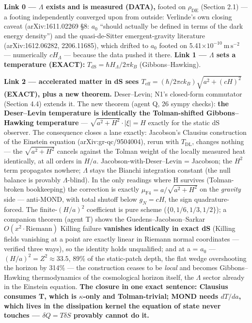 \documentclass[11pt,a4paper]{article}
\begin{document}
\textbf{Link 0 --- $\Lambda$ exists and is measured (DATA),} footed on $\rho_{\mathrm{DE}}$ (Section 2.1) --- a footing independently converged upon from outside: Verlinde's own closing caveat (arXiv:1611.02269 \S{}8: $a_{0}$ ``should actually be defined in terms of the dark energy density'') and the quasi-de-Sitter emergent-gravity literature (arXiv:1612.06282, 2206.11685), which drifted to $a_{0}$ footed on 5.41$\times10^{-10}\ \mathrm{m\,s^{-2}}$ --- numerically $cH_\Lambda$ --- because the data pushed it there. \textbf{Link 1 --- $\Lambda$ sets a temperature (EXACT):} $T_{\mathrm{dS}} = \hbar H_\Lambda/2\pi k_B$ (Gibbons--Hawking).

\textbf{Link 2 --- accelerated matter in dS sees $T_{\mathrm{eff}} = (\hbar/2\pi c k_B)\sqrt{a^2 + (cH)^2}$ (EXACT), plus a new theorem.} Deser--Levin; N1's closed-form commutator (Section 4.4) extends it. The new theorem (agent Q, 26 sympy checks): \textbf{the Deser--Levin temperature is identically the Tolman-shifted Gibbons--Hawking temperature} --- $\sqrt{a^2+H^2}\cdot|\xi| = H$ exactly for the static dS observer. The consequence closes a lane exactly: Jacobson's Clausius construction of the Einstein equation (arXiv:gr-qc/9504004), rerun with $T_{\mathrm{DL}}$, changes nothing --- the $\sqrt{a^2+H^2}$ cancels against the Tolman weight of the locally measured heat identically, at all orders in $H/a$. Jacobson-with-Deser--Levin = Jacobson; the $H^{2}$ term propagates nowhere; $\Lambda$ stays the Bianchi integration constant (the null balance is provably $\Lambda$-blind). In the only readings where H survives (Tolman-broken bookkeeping) the correction is exactly $\mu_{\mathrm{F4}} = a/\sqrt{a^2+H^2}$ on the \emph{gravity} side --- anti-MOND, with total shutoff below $g_N = cH$, the sign quadrature-forced. The finite-$(H/a)^2$ coefficient is pure scheme ($\{0, 1/6, 1/3, 1/2\}$); a companion theorem (agent T) shows the Guedens--Jacobson--Sarkar $O(x^2\cdot\mathrm{Riemann})$ Killing failure \textbf{vanishes identically in exact dS} (Killing fields vanishing at a point are exactly linear in Riemann normal coordinates --- verified three ways), so the identity holds unqualified; and at a = $a_{0}$ --- $(H/a)^2 = Z^2 \approx 33.5$, 89\% of the static-patch depth, the flat wedge overshooting the horizon by 314\% --- the construction ceases to be \emph{local} and becomes Gibbons--Hawking thermodynamics of the cosmological horizon itself, the $\Lambda$ sector already in the Einstein equation. \textbf{The closure in one exact sentence: Clausius consumes T, which is $\kappa$-only and Tolman-trivial; MOND needs $dT/da$, which lives in the dissipation kernel the equation of state never touches --- $\delta Q = T\delta S$ provably cannot do it.}
\end{document}
